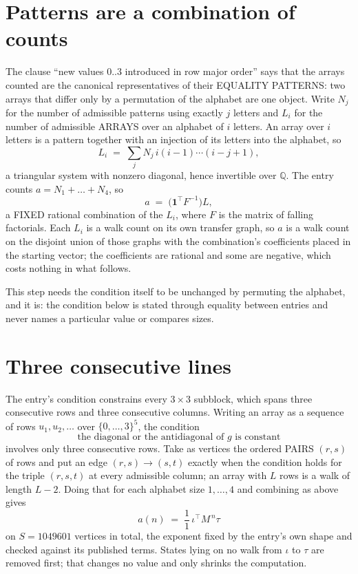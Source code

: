 \documentclass[11pt,a4paper]{article}
\theoremstyle{plain}
\theoremstyle{definition}
\begin{document}
\section{Patterns are a combination of counts}

The clause ``new values $0..3$ introduced in row major order'' says that the arrays
counted are the canonical representatives of their EQUALITY PATTERNS: two arrays that differ
only by a permutation of the alphabet are one object. Write $N_j$ for the number of admissible
patterns using exactly $j$ letters and $L_i$ for the number of admissible ARRAYS over an
alphabet of $i$ letters. An array over $i$ letters is a pattern together with an injection of
its letters into the alphabet, so
\[
L_i\;=\;\sum_{j}N_j\,i(i-1)\cdots(i-j+1),
\]
a triangular system with nonzero diagonal, hence invertible over $\mathbb{Q}$. The entry
counts $a=N_1+\dots+N_{4}$, so
\[
a\;=\;\bigl(\mathbf{1}^{\!\top}F^{-1}\bigr)L ,
\]
a FIXED rational combination of the $L_i$, where $F$ is the matrix of falling factorials.
Each $L_i$ is a walk count on its own transfer graph, so $a$ is a walk count on the disjoint
union of those graphs with the combination's coefficients placed in the starting vector; the
coefficients are rational and some are negative, which costs nothing in what follows.

This step needs the condition itself to be unchanged by permuting the alphabet, and it is:
the condition below is stated through equality between entries and never names a particular
value or compares sizes.

\section{Three consecutive lines}

The entry's condition constrains every $3\times3$ subblock, which spans three consecutive
rows and three consecutive columns. Writing an array as a sequence of rows
$u_1,u_2,\dots$ over $\{0,\dots,3\}^{5}$, the condition
\[
\text{the diagonal or the antidiagonal of }g\text{ is constant}
\]
involves only three consecutive rows. Take as vertices the ordered PAIRS $(r,s)$ of
rows and put an edge $(r,s)\to(s,t)$ exactly when the condition holds for the triple
$(r,s,t)$ at every admissible column; an array with $L$ rows is a walk of length $L-2$.
Doing that for each alphabet size $1,\dots,4$ and combining as above gives
\[
a(n)\;=\;\frac{1}{1}\,\iota^{\!\top}M^{\,n}\tau
\]
on $S=1049601$ vertices in total, the exponent fixed by the entry's own shape and checked against
its published terms. States lying on no walk from $\iota$ to $\tau$ are removed first; that
changes no value and only shrinks the computation.
\end{document}
